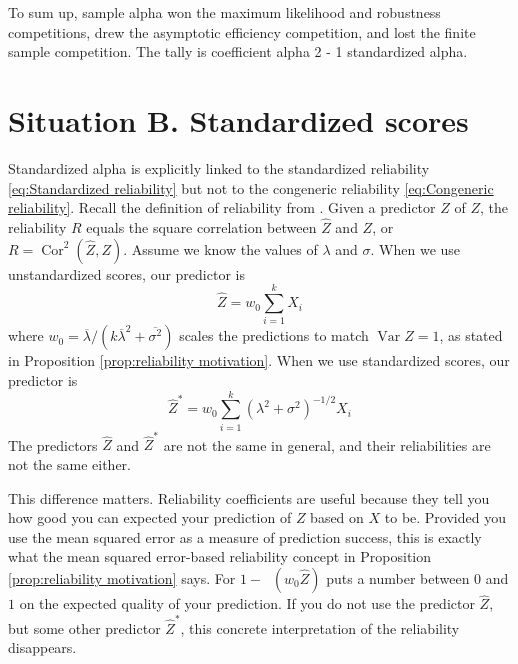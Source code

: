 \documentclass[twoside]{article}
\DeclareMathOperator{\Var}{Var}
\DeclareMathOperator{\Cor}{Cor}
\DeclareMathOperator{\MSE}{MSE_Z}
\begin{document}
To sum up, sample alpha won the maximum likelihood and robustness competitions, drew the asymptotic efficiency competition, and lost the finite sample competition. The tally is coefficient alpha 2 - 1 standardized alpha. 

\section{Situation B. Standardized scores}
\label{sec:argument B}

Standardized alpha is explicitly linked to the standardized reliability \eqref{eq:Standardized reliability} but not to the congeneric reliability \eqref{eq:Congeneric reliability}. Recall the definition of reliability from
. Given a predictor $\hat{Z}$ of $Z$, the
reliability $ R$ equals the square correlation between $\hat{Z}$
and $Z$, or $ R=\Cor^{2}(\hat{Z},Z)$. Assume
we know the values of $\lambda$ and $\sigma$. When we use unstandardized
scores, our predictor is 
\begin{equation}
\hat{Z}=w_{0}\sum_{i=1}^{k}X_{i}\label{eq:sum score}
\end{equation}
where $w_{0}=\overline{\lambda}/(k\overline{\lambda}^{2}+\overline{\sigma^{2}})$ scales the predictions to match $\Var Z=1$, as stated in Proposition \ref{prop:reliability motivation}. When we use standardized
scores, our predictor is
\begin{equation}
\hat{Z}^{*}=w_{0}\sum_{i=1}^{k}(\lambda^{2}+\sigma^{2})^{-1/2}X_{i}\label{eq:standardized sum score}
\end{equation}
The predictors $\hat{Z}$ and $\hat{Z}^{*}$ are not the same in general, and their reliabilities are not the same either.

This difference matters. Reliability coefficients are useful because they tell you how good you can expected your prediction of $Z$ based on $X$ to be. Provided you use the mean squared error as a measure of prediction success, this is exactly what the mean squared error-based reliability concept in Proposition \ref{prop:reliability motivation} says. For $1 - \MSE(w_0\hat{Z})$ puts a number between $0$ and $1$ on the expected quality of your prediction. If you do not use the predictor $\hat{Z}$, but some other predictor $\hat{Z}^*$, this concrete interpretation of the reliability disappears. 
\end{document}
